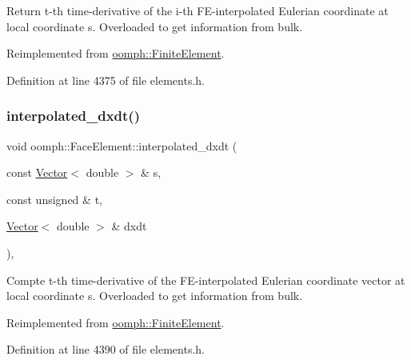 Return t-\/th time-\/derivative of the i-\/th F\+E-\/interpolated Eulerian coordinate at local coordinate s. Overloaded to get information from bulk. 



Reimplemented from \hyperlink{classoomph_1_1FiniteElement_a7e5ddde616cfd7fdd86a71d4120c9784}{oomph\+::\+Finite\+Element}.



Definition at line 4375 of file elements.\+h.

\mbox{\label{classoomph_1_1FaceElement_ae8741b05add40d08bb324c8e44effa11}} 
\subsubsection{\texorpdfstring{interpolated\+\_\+dxdt()}{interpolated\_dxdt()}\hspace{0.1cm}{\footnotesize\ttfamily [2/2]}}
{\footnotesize\ttfamily void oomph\+::\+Face\+Element\+::interpolated\+\_\+dxdt (\begin{DoxyParamCaption}\item[{const \hyperlink{classoomph_1_1Vector}{Vector}$<$ double $>$ \&}]{s,  }\item[{const unsigned \&}]{t,  }\item[{\hyperlink{classoomph_1_1Vector}{Vector}$<$ double $>$ \&}]{dxdt }\end{DoxyParamCaption})\hspace{0.3cm}{\ttfamily [inline]}, {\ttfamily [virtual]}}



Compte t-\/th time-\/derivative of the F\+E-\/interpolated Eulerian coordinate vector at local coordinate s. Overloaded to get information from bulk. 



Reimplemented from \hyperlink{classoomph_1_1FiniteElement_a60cfd1dabcc51fa90d19512fd9f793cb}{oomph\+::\+Finite\+Element}.



Definition at line 4390 of file elements.\+h.

\mbox{\label{classoomph_1_1FaceElement_a7aa612fec3604e08344503fbcdc357c8}} 
